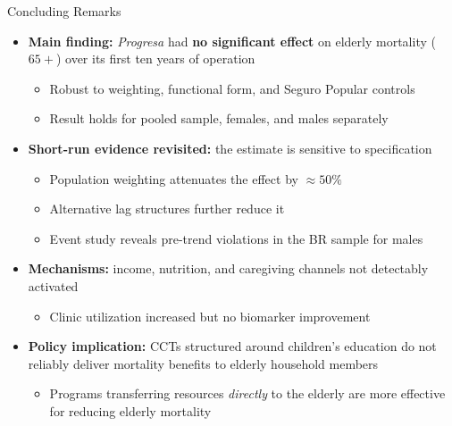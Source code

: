 \documentclass[aspectratio=169,usenames,dvipsnames]{beamer}
\newcommand{\smallcite}[1]{{\footnotesize\textcolor{Blue}{\citep{#1}}}}
\begin{document}
\begin{frame}{Concluding Remarks}\label{conclusion}
\small
\begin{itemize}
  \item[$\circ$] \textbf{Main finding:} \textit{Progresa} had \textbf{no significant effect} on elderly mortality ($65+$) over its first ten years of operation
    \begin{itemize}
      \item Robust to weighting, functional form, and Seguro Popular controls
      \item Result holds for pooled sample, females, and males separately
    \end{itemize}
  \vspace{4pt}
  \item[$\circ$] \textbf{Short-run evidence revisited:} the \smallcite{BarhamRowberry2013JDE} estimate is sensitive to specification
    \begin{itemize}
      \item Population weighting attenuates the effect by $\approx 50\%$
      \item Alternative lag structures further reduce it
      \item Event study reveals pre-trend violations in the BR sample for males
    \end{itemize}
  \vspace{4pt}
  \item[$\circ$] \textbf{Mechanisms:} income, nutrition, and caregiving channels not detectably activated
    \begin{itemize}
      \item Clinic utilization increased but no biomarker improvement \smallcite{aguila2024conditional}
    \end{itemize}
  \vspace{4pt}
  \item[$\circ$] \textbf{Policy implication:} CCTs structured around children's education do not reliably deliver mortality benefits to elderly household members
    \begin{itemize}
      \item Programs transferring resources \textit{directly} to the elderly are more effective for reducing elderly mortality \smallcite{Menares2026JHR, MiglinoNavarrete2023AEJP}
    \end{itemize}
\end{itemize}
\end{frame}

\end{document}
